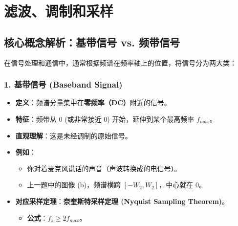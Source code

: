 \chapter{滤波、调制和采样}

\section{核心概念解析：基带信号 vs. 频带信号}

在信号处理和通信中，通常根据频谱在频率轴上的位置，将信号分为两大类：

\subsection{1. 基带信号 (Baseband Signal)}
\begin{itemize}
    \item \textbf{定义}：频谱分量集中在\textbf{零频率（DC）}附近的信号。
    \item \textbf{特征}：频带从 $0$ (或非常接近 $0$) 开始，延伸到某个最高频率 $f_{max}$。
    \item \textbf{直观理解}：这是未经调制的原始信号。
    \item \textbf{例如}：
    \begin{itemize}
        \item 你对着麦克风说话的声音（声波转换成的电信号）。
        \item 上一题中的图像 (b)，频谱横跨 $[-W_2, W_2]$，中心就在 $0$。
    \end{itemize}
    \item \textbf{对应采样定理}：\textbf{奈奎斯特采样定理 (Nyquist Sampling Theorem)}。
    \begin{itemize}
        \item \textbf{公式}：$f_s \ge 2 f_{max}$。
    \end{itemize}
\end{itemize}

